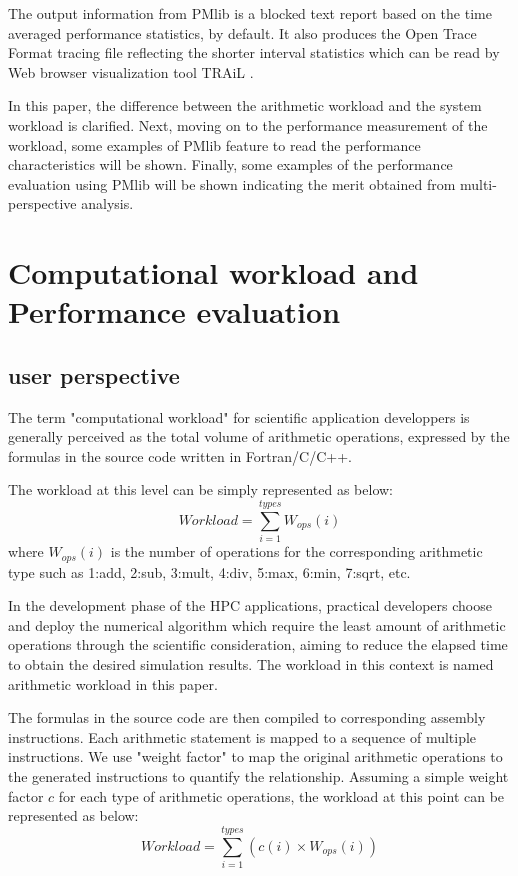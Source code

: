 \documentclass[conference]{IEEEtran}
\begin{document}
The output information from PMlib is a blocked text report based on
the time averaged performance statistics, by default.
It also produces the Open Trace Format \cite{} tracing file reflecting
the shorter interval statistics which can be read by Web browser
visualization tool TRAiL \cite{}.

In this paper, the difference between the arithmetic workload and the system
workload is clarified.
Next, moving on to the performance measurement of the workload,
some examples of PMlib feature to read the performance characteristics
will be shown.
Finally, some examples of the performance evaluation using PMlib
will be shown indicating the merit obtained from multi-perspective analysis.


\section{Computational workload and Performance evaluation}
\subsection{user perspective}
\label{subsection:user-perspective}

The term "computational workload" for scientific application developpers
is generally perceived as the total volume of arithmetic operations,
expressed by the formulas in the source code written in Fortran/C/C++.

The workload at this level can be simply represented as below:
\begin{equation}\label{eq:arithmetic-workload}
	Workload = \sum_{i=1}^{types} W_{ops}(i)
\end{equation}
where $ W_{ops}(i) $ is the number of operations for the
corresponding arithmetic type such as
1:add, 2:sub, 3:mult, 4:div, 5:max, 6:min, 7:sqrt, etc.

In the development phase of the HPC applications, practical developers
choose and deploy the numerical algorithm which require the least
amount of arithmetic operations through the scientific consideration,
aiming to reduce the elapsed time to obtain the desired simulation results.
The workload in this context is named arithmetic workload in this paper.


The formulas in the source code are then compiled to corresponding assembly
instructions.
Each arithmetic statement is mapped to a sequence of multiple instructions.
We use "weight factor" to map the original arithmetic operations to the
generated instructions to quantify the relationship.
Assuming a simple weight factor $ c $ for each type of
arithmetic operations, 
the workload at this point can be represented as below:
\begin{equation}\label{eq:application-workload}
		Workload = \sum_{i=1}^{types} \left(c(i)\times W_{ops}(i)\right)
\end{equation}
\end{document}
